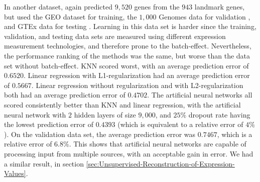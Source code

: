 In another dataset, \cite{ChenXie2015} again predicted $9,520$ genes
from the $943$ landmark genes, but used the GEO dataset for training,
the $1,000$ Genomes data for validation \cite{LappalainenPedro2013},
and GTEx data for testing \cite{ArdlieLek2015}. Learning in this
data set is harder since the training, validation, and testing data
sets are measured using different expression measurement technologies,
and therefore prone to the batch-effect. Nevertheless, the performance
ranking of the methods was the same, but worse than the data set without
batch-effect. KNN scored worst, with an average prediction error of
$0.6520$. Linear regression with L1-regularization had an average
prediction error of $0.5667$. Linear regression without regularization
and with L2-regularization both had an average prediction error of
$0.4702$. The artificial neural networks all scored consistently
better than KNN and linear regression, with the artificial neural
network with $2$ hidden layers of size $9,000$, and $25\%$ dropout
rate having the lowest prediction error of $0.4393$ (which is equivalent
to a relative error of $4\%$). On the validation data set, the average
prediction error was $0.7467$, which is a relative error of $6.8\%$.
This shows that artificial neural networks are capable of processing
input from multiple sources, with an acceptable gain in error. We
had a similar result, in section \ref{sec:Unsupervised-Reconstruction-of-Expression-Values}.
